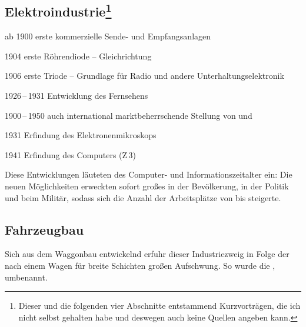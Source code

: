 
\subsection[Elektroindustrie]{Elektroindustrie\footnote{Dieser und die
folgenden vier Abschnitte entstammend Kurzvorträgen, die ich nicht
selbst gehalten habe und deswegen auch keine Quellen angeben kann.}}
\label{ssc:el-ind}

\begin{chronik}
\item[ab 1900]
erste kommerzielle Sende- und Empfangsanlagen

\item[1904]
erste Röhrendiode -- Gleichrichtung

\item[1906]
erste Triode -- Grundlage für Radio und andere Unterhaltungselektronik 

\item[1926\,--\,1931] Entwicklung des Fernsehens

\item[1900\,--\,1950] auch international marktbeherrschende Stellung
von  und 

\item[1931]
Erfindung des Elektronenmikroskops

\item[1941]
Erfindung des Computers (Z\,3)
\end{chronik}

Diese Entwicklungen läuteten des Computer- und Informationszeitalter
ein: Die neuen Möglichkeiten erweckten sofort großes in der
Bevölkerung, in der Politik und beim Militär, sodass sich die Anzahl
der Arbeitsplätze von  bis  steigerte.


\subsection{Fahrzeugbau}
\label{ssc:fahrzbau}

Sich aus dem Waggonbau entwickelnd erfuhr dieser Industriezweig in
Folge der  nach einem
Wagen für breite Schichten  großen Aufschwung. So wurde
 die , 
umbenannt.

